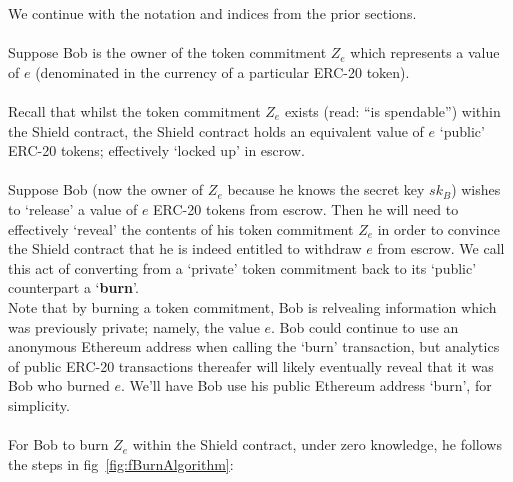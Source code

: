 \documentclass{article}
\begin{document}
We continue with the notation and indices from the prior sections.\\
\\
Suppose Bob is the owner of the token commitment $Z_e$ which represents a value of $e$ (denominated in the currency of a particular ERC-20 token).\\
\\
Recall that whilst the token commitment $Z_e$ exists (read: ``is spendable'') within the Shield contract, the Shield contract holds an equivalent value of $e$ `public' ERC-20 tokens; effectively `locked up' in escrow.\\
\\
Suppose Bob (now the owner of $Z_e$ because he knows the secret key $sk_B$) wishes to `release' a value of $e$ ERC-20 tokens from escrow.
Then he will need to effectively `reveal' the contents of his token commitment $Z_e$ in order to convince the Shield contract that he is indeed entitled to withdraw $e$ from escrow.
We call this act of converting from a `private' token commitment back to its `public' counterpart a `\textbf{burn}'.
\\
Note that by burning a token commitment, Bob is relvealing information which was previously private; namely, the value $e$. Bob could continue to use an anonymous Ethereum address when calling the `burn' transaction, but analytics of public ERC-20 transactions thereafer will likely eventually reveal that it was Bob who burned $e$. We'll have Bob use his public Ethereum address `burn', for simplicity.\\
\\

\noindent
For Bob to burn $Z_e$ within the Shield contract, under zero knowledge, he follows the steps in fig~\ref{fig:fBurnAlgorithm}:
\end{document}

